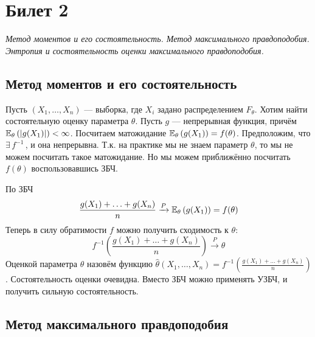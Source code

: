 \section{Билет 2}

\begin{center}
    \it
    Метод моментов и его состоятельность.
    Метод максимального правдоподобия.
    Энтропия и состоятельность оценки максимального правдоподобия.
\end{center}

\usetikzlibrary{arrows}

\subsection{Метод моментов и его состоятельность}
Пусть $(X_1, \ldots, X_n)$ --- выборка, где $X_i$ задано распределением $F_{\theta}$. Хотим найти состоятельную оценку параметра $\theta$.
Пусть $g$ --- непрерывная функция, причём $\mathbb{E}_{\theta}\left( |g(X_1)| \right) < \infty$. Посчитаем матожидание
$\mathbb{E}_{\theta}\left( g(X_1) \right) = f(\theta)$. Предположим, что $\exists\, f^{-1}\,$, и она непрерывна. Т.к. на практике мы не знаем параметр
$\theta$, то мы не можем посчитать такое матожидание. Но мы можем приближённо посчитать $f(\theta)$ воспользовавшись ЗБЧ.

По ЗБЧ
\[
    \frac{g(X_1) + \ldots + g(X_n)}{n} \xrightarrow{P} \mathbb{E}_{\theta}\left( g(X_1) \right) = f(\theta)
\]
Теперь в силу обратимости $f$ можно получить сходимость к $\theta$:
\[
    f^{-1}\left( \frac{g(X_1) + \ldots + g(X_n)}{n} \right) \xrightarrow{P} \theta
\]
Оценкой параметра $\theta$ назовём функцию $\hat{\theta}(X_1, \ldots, X_n) = f^{-1}\left( \frac{g(X_1) + \ldots + g(X_n)}{n} \right)$. Состоятельность
оценки очевидна. Вместо ЗБЧ можно применять УЗБЧ, и получить сильную состоятельность.

\subsection{Метод максимального правдоподобия}
